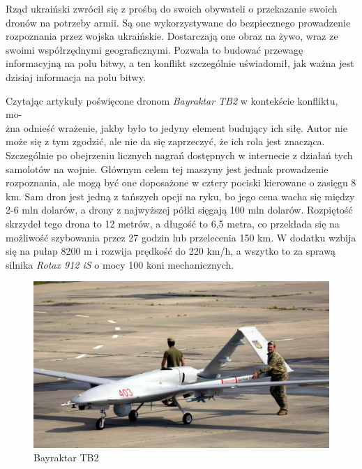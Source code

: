 Rząd ukraiński zwrócił się z prośbą do swoich obywateli o przekazanie swoich dronów na potrzeby armii. Są one wykorzystywane do bezpiecznego prowadzenie rozpoznania przez wojska ukraińskie. Dostarczają one obraz na żywo, wraz ze swoimi współrzędnymi geograficznymi. Pozwala to budować przewagę informacyjną na polu bitwy, a ten konflikt szczególnie uświadomił, jak ważna jest dzisiaj informacja na polu bitwy.\cite{fotografia-drony-ukraina}

Czytając artykuły poświęcone dronom \textit{Bayraktar TB2} w kontekście konfliktu, mo-\\żna odnieść wrażenie, jakby było to jedyny element budujący ich siłę. Autor nie może się z tym zgodzić, ale nie da się zaprzeczyć, że ich rola jest znacząca. Szczególnie po obejrzeniu licznych nagrań dostępnych w internecie z działań tych samolotów na wojnie. Głównym celem tej maszyny jest jednak prowadzenie rozpoznania, ale mogą być one doposażone w cztery pociski kierowane o zasięgu 8 km. Sam dron jest jedną z tańszych opcji na ryku, bo jego cena wacha się między 2-6 mln dolarów, a drony z najwyższej półki sięgają 100 mln dolarów. Rozpiętość skrzydeł tego drona to 12 metrów, a długość to 6,5 metra, co przekłada się na możliwość szybowania przez 27 godzin lub przelecenia 150 km. W dodatku wzbija się na pułap 8200 m i rozwija prędkość do 220 km/h, a wszytko to za sprawą silnika \textit{Rotax 912 iS} o mocy 100 koni mechanicznych.\cite{bayraktar-chip}\cite{bayraktar-pap}

\begin{figure}[!ht]
\begin{center}
  \includegraphics[width=12cm]{./Obrazy/Bayraktar_TB2_ukraina.jpg}
  \caption{Bayraktar TB2}
  \end{center}
\end{figure}



